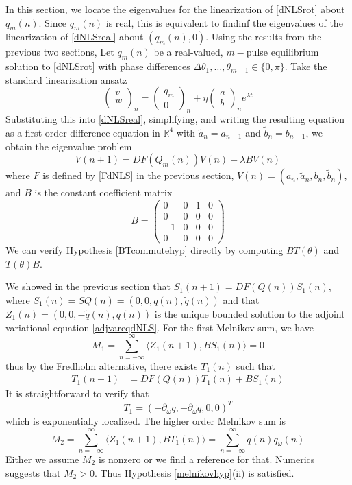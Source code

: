 \documentclass[12pt]{article}
\def\R{{\mathbb R}}
\begin{document}
In this section, we locate the eigenvalues for the linearization of \eqref{dNLSrot} about $q_m(n)$. Since $q_m(n)$ is real, this is equivalent to findinf the eigenvalues of the linearization of \eqref{dNLSreal} about $(q_m(n), 0)$. 
Using the results from the previous two sections, Let $q_m(n)$ be a real-valued, $m-$pulse equilibrium solution to \eqref{dNLSrot} with phase differences $\Delta \theta_1, \dots, \theta_{m-1} \in \{0, \pi\}$. Take the standard linearization ansatz
\[
\begin{pmatrix}v \\ w \\ \end{pmatrix}_n = 
\begin{pmatrix}q_m \\ 0 \end{pmatrix}_n + 
\eta \begin{pmatrix}a \\ b \end{pmatrix}_n e^{\lambda t}
\]
Substituting this into \eqref{dNLSreal}, simplifying, and writing the resulting equation as a first-order difference equation in $\R^4$ with $\tilde{a}_n = a_{n-1}$ and $\tilde{b}_n = b_{n-1}$, we obtain the eigenvalue problem 
\begin{equation}\label{dNLSEVP}
V(n+1) = DF(Q_m(n)) V(n) + \lambda B V(n)
\end{equation}
where $F$ is defined by \eqref{FdNLS} in the previous section, $V(n) = (a_n, \tilde{a}_n, b_n, \tilde{b}_n)$, and $B$ is the constant coefficient matrix 
\[
B = 
\begin{pmatrix}
0 & 0 & 1 & 0 \\
0 & 0 & 0 & 0 \\
-1 & 0 & 0 & 0 \\
0 & 0 & 0 & 0
\end{pmatrix}
\]
We can verify Hypothesis \ref{BTcommutehyp} directly by computing $B T(\theta)$ and $T(\theta) B$.

We showed in the previous section that $S_1(n+1) = DF(Q(n)) S_1(n)$, where $S_1(n) = S Q(n) = (0, 0, q(n), \tilde{q}(n))$ and that $Z_1(n) = (0, 0, -\tilde{q}(n), q(n))$ is the unique bounded solution to the adjoint variational equation \eqref{adjvareqdNLS}. For the first Melnikov sum, we have
\[
M_1 = \sum_{n=-\infty}^\infty \langle Z_1(n+1), B S_1(n) \rangle = 0
\]
thus by the Fredholm alternative, there exists $T_1(n)$ such that 
\begin{align*}
T_1(n+1) &= DF(Q(n)) T_1(n) + B S_1(n)
\end{align*}
It is straightforward to verify that 
\begin{equation}\label{defT1}
T_1 = (-\partial_\omega q, -\partial_\omega \tilde{q}, 0, 0)^T
\end{equation}
which is exponentially localized. The higher order Melnikov sum is
\[
M_2 = \sum_{n=-\infty}^\infty \langle Z_1(n+1), B T_1(n) \rangle =
\sum_{n=-\infty}^\infty q(n) q_\omega(n)
\]
Either we assume $M_2$ is nonzero or we find a reference for that. Numerics suggests that $M_2 > 0$. Thus Hypothesis \ref{melnikovhyp}(ii) is satisfied.
\end{document}
